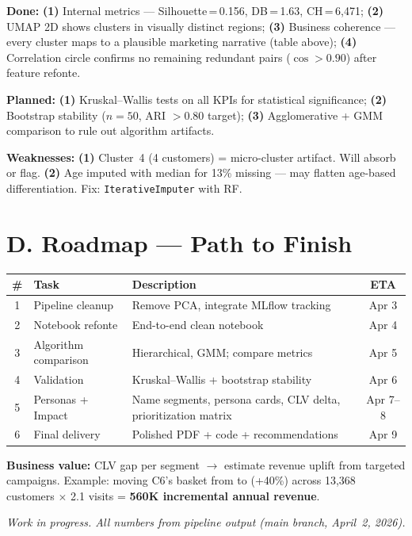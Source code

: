 \documentclass[8pt,a4paper]{article}
\begin{document}
\textbf{Done:}
\textbf{(1)} Internal metrics --- Silhouette\,=\,0.156, DB\,=\,1.63, CH\,=\,6{,}471;
\textbf{(2)} UMAP 2D shows clusters in visually distinct regions;
\textbf{(3)} Business coherence --- every cluster maps to a plausible marketing narrative (table above);
\textbf{(4)} Correlation circle confirms no remaining redundant pairs ($\cos{>}0.90$) after feature refonte.

\textbf{Planned:}
\textbf{(1)} Kruskal--Wallis tests on all KPIs for statistical significance;
\textbf{(2)} Bootstrap stability ($n{=}50$, ARI $>0.80$ target);
\textbf{(3)} Agglomerative + GMM comparison to rule out algorithm artifacts.

\textbf{Weaknesses:}
\textbf{(1)} Cluster~4 (4 customers) = micro-cluster artifact. Will absorb or flag.
\textbf{(2)} Age imputed with median for 13\% missing --- may flatten age-based differentiation. Fix: \texttt{IterativeImputer} with RF.

\section{D. Roadmap --- Path to Finish}

\vspace{-2pt}
\begin{table}[H]
\centering\scriptsize
\begin{tabularx}{\textwidth}{@{}c l X c@{}}
\toprule
\textbf{\#} & \textbf{Task} & \textbf{Description} & \textbf{ETA} \\
\midrule
1 & Pipeline cleanup & Remove PCA, integrate MLflow tracking & Apr 3 \\
2 & Notebook refonte & End-to-end clean notebook & Apr 4 \\
3 & Algorithm comparison & Hierarchical, GMM; compare metrics & Apr 5 \\
4 & Validation & Kruskal--Wallis + bootstrap stability & Apr 6 \\
5 & Personas + Impact & Name segments, persona cards, CLV delta, prioritization matrix & Apr 7--8 \\
6 & Final delivery & Polished PDF + code + recommendations & Apr 9 \\
\bottomrule
\end{tabularx}
\end{table}
\vspace{-4pt}

\textbf{Business value:} CLV gap per segment $\to$ estimate revenue uplift from targeted campaigns. Example: moving C6's basket from  to  (+40\%) across 13{,}368 customers $\times$ 2.1 visits = \textbf{\texteuro560K incremental annual revenue}.

\vfill
\begin{center}
\scriptsize\color{gray}\itshape Work in progress. All numbers from pipeline output (main branch, April~2, 2026).
\end{center}
\end{document}
